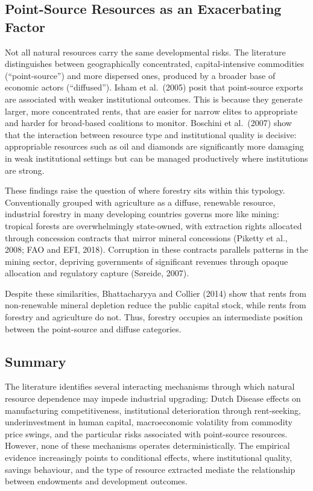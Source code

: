 \documentclass[12pt,a4paper]{report}
\begin{document}
\subsection{Point-Source Resources as an Exacerbating Factor}

Not all natural resources carry the same developmental risks. The literature distinguishes between geographically concentrated, capital-intensive commodities (``point-source'') and more dispersed ones, produced by a broader base of economic actors (``diffused''). Isham et al.\ (2005) posit that point-source exports are associated with weaker institutional outcomes. This is because they generate larger, more concentrated rents, that are easier for narrow elites to appropriate and harder for broad-based coalitions to monitor. Boschini et al.\ (2007) show that the interaction between resource type and institutional quality is decisive: appropriable resources such as oil and diamonds are significantly more damaging in weak institutional settings but can be managed productively where institutions are strong.

These findings raise the question of where forestry sits within this typology. Conventionally grouped with agriculture as a diffuse, renewable resource, industrial forestry in many developing countries governs more like mining: tropical forests are overwhelmingly state-owned, with extraction rights allocated through concession contracts that mirror mineral concessions (Piketty et al., 2008; FAO and EFI, 2018). Corruption in these contracts parallels patterns in the mining sector, depriving governments of significant revenues through opaque allocation and regulatory capture (S{\o}reide, 2007).

Despite these similarities, Bhattacharyya and Collier (2014) show that rents from non-renewable mineral depletion reduce the public capital stock, while rents from forestry and agriculture do not. Thus, forestry occupies an intermediate position between the point-source and diffuse categories.

\subsection{Summary}

The literature identifies several interacting mechanisms through which natural resource dependence may impede industrial upgrading: Dutch Disease effects on manufacturing competitiveness, institutional deterioration through rent-seeking, underinvestment in human capital, macroeconomic volatility from commodity price swings, and the particular risks associated with point-source resources. However, none of these mechanisms operates deterministically. The empirical evidence increasingly points to conditional effects, where institutional quality, savings behaviour, and the type of resource extracted mediate the relationship between endowments and development outcomes.
\end{document}

